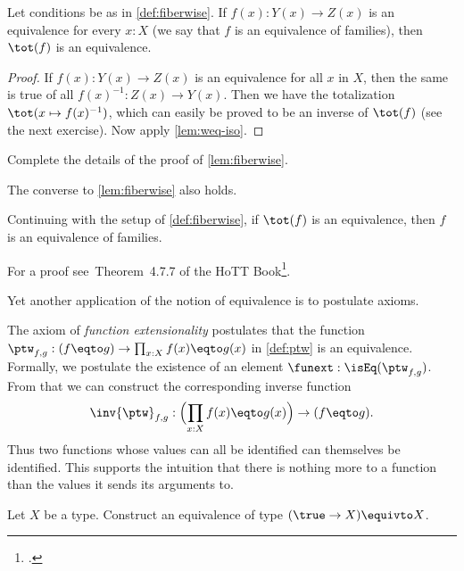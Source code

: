 \begin{lemma}\label{lem:fiberwise}
Let conditions be as in \cref{def:fiberwise}.
If $f(x): Y(x) \to Z(x)$ is an equivalence for every $x:X$
(we say that $f$ is an equivalence of families),
then $\tot(f)$ is an equivalence.
\end{lemma}
\begin{proof}
If $f(x): Y(x) \to Z(x)$ is an equivalence for all $x$ in $X$,
then the same is true of all $f(x)^{-1}: Z(x) \to Y(x)$.
Then we have the totalization $\tot(x\mapsto f(x)^{-1})$,
which can easily be proved to be an inverse of $\tot(f)$
(see the next exercise). Now apply \cref{lem:weq-iso}.
\end{proof}

\begin{xca}\label{xca:fiberwise}
Complete the details of the proof of \cref{lem:fiberwise}.
\end{xca}

The converse to \cref{lem:fiberwise} also holds.
\begin{lemma}\label{lem:fiberwise-equiv-from-tot}
  Continuing with the setup of \cref{def:fiberwise},
  if $\tot(f)$ is an equivalence, then $f$ is an equivalence of families.
\end{lemma}
For a proof see~Theorem~4.7.7 of the HoTT Book\footcite{hottbook}.

Yet another application of the notion of equivalence is to postulate axioms.

\begin{principle}\label{def:funext}
The axiom of \emph{function extensionality} postulates that the function
$\ptw_{f,g}: (f \eqto g) \to \prod_{x:X} f(x) \eqto g(x)$ in \cref{def:ptw} is an equivalence.
Formally, we postulate the existence of an element $\funext : \isEq(\ptw_{f,g})$.
From that we can construct the corresponding inverse function
\[
\inv{\ptw}_{f,g}: \Bigl(\prod_{x:X} f(x) \eqto g(x)\Bigr) \to (f \eqto g).
\]
Thus two functions whose values can all be identified can themselves be identified.
This supports the intuition that there is nothing more to a function than the values
it sends its arguments to.
\end{principle}

\begin{xca}\label{xca:Xequiv1toX}
  Let $X$ be a type.  Construct an equivalence of type $( \true \to X ) \equivto X $.
\end{xca}


